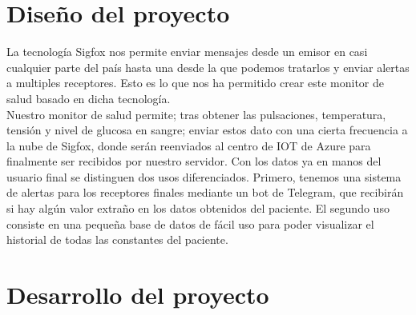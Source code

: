 \documentclass[12pt,a4paper]{article}
\begin{document}
\section{Diseño del proyecto}
La tecnología Sigfox nos permite enviar mensajes desde un emisor en casi cualquier parte del país hasta una desde la que podemos tratarlos y enviar alertas a multiples receptores. Esto es lo que nos ha permitido crear este monitor de salud basado en dicha tecnología.\\ 
Nuestro monitor de salud permite; tras obtener las pulsaciones, temperatura, tensión y nivel de glucosa en sangre; enviar estos dato con una cierta frecuencia a la nube de Sigfox, donde serán reenviados al centro de IOT de Azure para finalmente ser recibidos por nuestro servidor. Con los datos ya en manos del usuario final se distinguen dos usos diferenciados. Primero, tenemos una sistema de alertas para los receptores finales mediante un bot de Telegram, que recibirán si hay algún valor extraño en los datos obtenidos del paciente. El segundo uso consiste en una pequeña base de datos de fácil uso para poder visualizar el historial de todas las constantes del paciente.

\section{Desarrollo del proyecto}


\begin{figure}[h] \label{fig:1}
\begin{center}
\end{center}
\end{figure}
\end{document}
